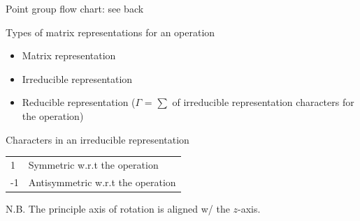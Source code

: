 \documentclass[10pt,landscape]{article}
\newcommand{\extraline}{\vspace{1em}}
\newcommand{\halfline}{\vspace{0.5em}}
\newcommand{\tableindent}{\hspace{1.5em}}
\begin{document}
\begin{multicols}{3}
Point group flow chart: see back

Types of matrix representations for an operation
\begin{itemize}
	\item Matrix representation
	\item Irreducible representation
	\item Reducible representation ($\Gamma$ = $\sum$ of irreducible representation characters for the operation)
\end{itemize}

Characters in an irreducible representation
\begin{tabular}{@{\tableindent}ll@{}}
	1 & Symmetric w.r.t the operation \\
	-1 & Antisymmetric w.r.t the operation \\
\end{tabular}

\tableindent N.B. The principle axis of rotation is aligned w/ the $z$-axis.
\halfline


\end{multicols}
\end{document}
